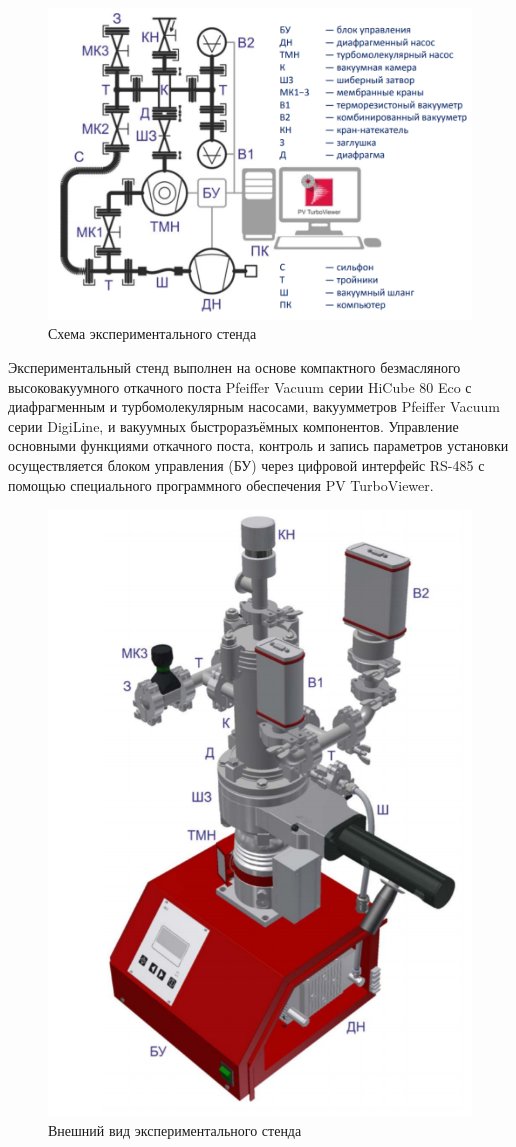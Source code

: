 \documentclass[a4paper,12pt]{article}
\begin{document}
\begin{figure}[h]
    \centering
    \includegraphics[width = 13 cm]{Схема}
    \caption{Схема экспериментального стенда}
    \label{fig:vac}
\end{figure}

Экспериментальный стенд выполнен на основе компактного безмасляного высоковакуумного откачного поста Pfeiffer Vacuum серии HiCube 80 Eco с диафрагменным и турбомолекулярным насосами, вакуумметров Pfeiffer Vacuum серии DigiLine, и вакуумных быстроразъёмных компонентов. Управление основными функциями откачного
поста, контроль и запись параметров установки осуществляется блоком управления (БУ) через цифровой интерфейс RS-485 с помощью специального программного обеспечения PV TurboViewer.

\begin{figure}[h]
    \centering
    \includegraphics[width = 10.5 cm]{Внешний вид}
    \caption{Внешний вид экспериментального стенда}
    \label{fig:vac}
\end{figure}
\end{document}
